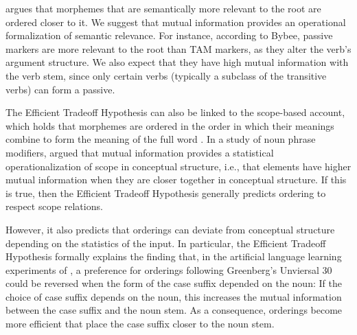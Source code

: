 \documentclass[11pt,letterpaper]{article}
\newcommand{\citep}{\parencite}
\newcommand{\citet}{\Textcite}
\newcommand\mhahn[1]{{\color{red}(#1)}}
\begin{document}

\citet{bybee-morphology-1985} argues that morphemes that are semantically more relevant to the root are ordered closer to it.
We suggest that mutual information provides an operational formalization of semantic relevance.
For instance, according to Bybee, passive markers are more relevant to the root than TAM markers, as they alter the verb's argument structure.
We also expect that they have high mutual information with the verb stem, since only certain verbs (typically a subclass of the transitive verbs) can form a passive.



The Efficient Tradeoff Hypothesis can also be linked to the scope-based account, which holds that morphemes are ordered in the order in which their meanings combine to form the meaning of the full word \citep{rice2000morpheme}.
In a study of noun phrase modifiers, \citet{culbertson2020from} argued that mutual information provides a statistical operationalization of scope in conceptual structure, i.e., that elements have higher mutual information when they are closer together in conceptual structure.
If this is true, then the Efficient Tradeoff Hypothesis generally predicts ordering to respect scope relations.

However, it also predicts that orderings can deviate from conceptual structure depending on the statistics of the input.
In particular, the Efficient Tradeoff Hypothesis formally explains the finding that, in the artificial language learning experiments of \citet{saldana2021cross}, a preference for orderings following Greenberg's Unviersal 30 could be reversed when the form of the case suffix depended on the noun:
If the choice of case suffix depends on the noun, this increases the mutual information between the case suffix and the noun stem.
As a consequence, orderings become more efficient that place the case suffix closer to the noun stem.

\end{document}
